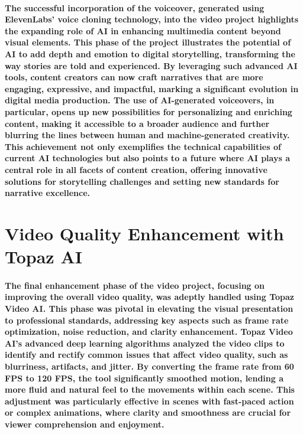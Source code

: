 \documentclass[11pt,a4paper,oneside]{report}
\begin{document}
\paragraph{The successful incorporation of the voiceover, generated using ElevenLabs' voice cloning technology, into the video project highlights the expanding role of AI in enhancing multimedia content beyond visual elements. This phase of the project illustrates the potential of AI to add depth and emotion to digital storytelling, transforming the way stories are told and experienced. By leveraging such advanced AI tools, content creators can now craft narratives that are more engaging, expressive, and impactful, marking a significant evolution in digital media production. The use of AI-generated voiceovers, in particular, opens up new possibilities for personalizing and enriching content, making it accessible to a broader audience and further blurring the lines between human and machine-generated creativity. This achievement not only exemplifies the technical capabilities of current AI technologies but also points to a future where AI plays a central role in all facets of content creation, offering innovative solutions for storytelling challenges and setting new standards for narrative excellence.}

\section{Video Quality Enhancement with Topaz AI}

\paragraph{The final enhancement phase of the video project, focusing on improving the overall video quality, was adeptly handled using Topaz Video AI. This phase was pivotal in elevating the visual presentation to professional standards, addressing key aspects such as frame rate optimization, noise reduction, and clarity enhancement. Topaz Video AI's advanced deep learning algorithms analyzed the video clips to identify and rectify common issues that affect video quality, such as blurriness, artifacts, and jitter. By converting the frame rate from 60 FPS to 120 FPS, the tool significantly smoothed motion, lending a more fluid and natural feel to the movements within each scene. This adjustment was particularly effective in scenes with fast-paced action or complex animations, where clarity and smoothness are crucial for viewer comprehension and enjoyment.}
\end{document}
